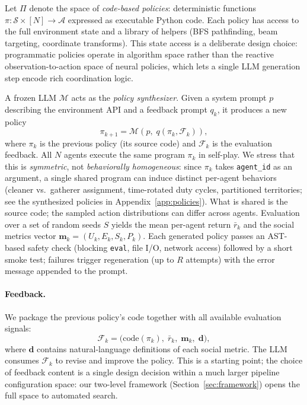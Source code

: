 \documentclass{article}
\newcommand{\cM}{\mathcal{M}}
\newcommand{\bm}{\mathbf{m}}
\begin{document}
Let $\Pi$ denote the space of \emph{code-based policies}: deterministic functions $\pi: \mathcal{S} \times [N] \to \mathcal{A}$ expressed as executable Python code. Each policy has access to the full environment state and a library of helpers (BFS pathfinding, beam targeting, coordinate transforms). This state access is a deliberate design choice: programmatic policies operate in algorithm space rather than the reactive observation-to-action space of neural policies, which lets a single LLM generation step encode rich coordination logic.

A frozen LLM $\cM$ acts as the \emph{policy synthesizer}. Given a system prompt $p$ describing the environment API and a feedback prompt $q_k$, it produces a new policy
\[
  \pi_{k+1} = \cM\!\left(p,\; q(\pi_k, \mathcal{F}_k)\right),
\]
where $\pi_k$ is the previous policy (its source code) and $\mathcal{F}_k$ is the evaluation feedback. All $N$ agents execute the same program $\pi_k$ in self-play. We stress that this is \emph{symmetric}, not \emph{behaviorally homogeneous}: since $\pi_k$ takes \texttt{agent\_id} as an argument, a single shared program can induce distinct per-agent behaviors (cleaner vs.\ gatherer assignment, time-rotated duty cycles, partitioned territories; see the synthesized policies in Appendix~\ref{app:policies}). What is shared is the source code; the sampled action distributions can differ across agents. Evaluation over a set of random seeds $S$ yields the mean per-agent return $\bar r_k$ and the social metrics vector $\bm_k = (U_k, E_k, S_k, P_k)$. Each generated policy passes an AST-based safety check (blocking \texttt{eval}, file I/O, network access) followed by a short smoke test; failures trigger regeneration (up to $R$ attempts) with the error message appended to the prompt.

\paragraph{Feedback.} We package the previous policy's code together with all available evaluation signals:
\begin{equation}
  \mathcal{F}_k = \big(\textrm{code}(\pi_k),\; \bar r_k,\; \bm_k,\; \mathbf{d}\big),
\end{equation}
where $\mathbf{d}$ contains natural-language definitions of each social metric. The LLM consumes $\mathcal{F}_k$ to revise and improve the policy. This is a starting point; the choice of feedback content is a single design decision within a much larger pipeline configuration space: our two-level framework (Section~\ref{sec:framework}) opens the full space to automated search.
\end{document}
